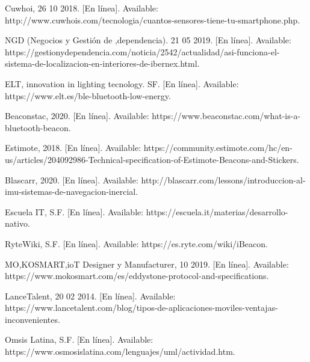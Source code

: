 \documentclass[conference,compsoc,onecolumn]{IEEEtran}
\begin{document}
\begin{thebibliography}{0}
   Cuwhoi, 26 10 2018. [En línea]. Available: http://www.cuwhois.com/tecnologia/cuantos-sensores-tiene-tu-smartphone.php.\newline
  
   NGD (Negocios y Gestión de ,dependencia). 21 05 2019. [En línea]. Available: https://gestionydependencia.com/noticia/2542/actualidad/asi-funciona-el-sistema-de-localizacion-en-interiores-de-ibernex.html. \newline
                             
   ELT, innovation in lighting tecnology. SF. [En línea]. Available: https://www.elt.es/ble-bluetooth-low-energy.\newline
   
   Beaconstac, 2020. [En línea]. Available: https://www.beaconstac.com/what-is-a-bluetooth-beacon.\newline
   
   Estimote, 2018. [En línea]. Available: https://community.estimote.com/hc/en-us/articles/204092986-Technical-specification-of-Estimote-Beacons-and-Stickers.\newline
   
    Blascarr, 2020. [En línea]. Available: http://blascarr.com/lessons/introduccion-al-imu-sistemas-de-navegacion-inercial.\newline

    Escuela IT, S.F. [En línea]. Available: https://escuela.it/materias/desarrollo-nativo.\newline
    
    RyteWiki, S.F. [En línea]. Available: https://es.ryte.com/wiki/iBeacon.\newline
    
    MO,KOSMART,ioT Designer y Manufacturer, 10 2019. [En línea]. Available: https://www.mokosmart.com/es/eddystone-protocol-and-specifications.\newline

    LanceTalent, 20 02 2014. [En línea]. Available: https://www.lancetalent.com/blog/tipos-de-aplicaciones-moviles-ventajas-inconvenientes.\newline
    
    Omsis Latina, S.F. [En línea]. Available: https://www.osmosislatina.com/lenguajes/uml/actividad.htm.\newline
    

\end{thebibliography}
\end{document}
